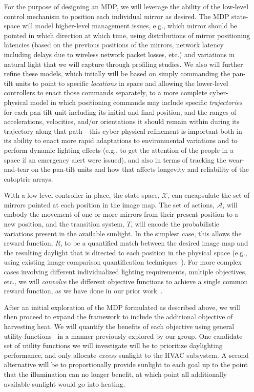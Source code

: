 For the purpose of designing an MDP, we will leverage the ability of the low-level
control mechanism to position each individual mirror as desired.  The MDP state-space 
will model higher-level management issues, e.g., which mirror should be pointed in which 
direction at which time, using distributions of mirror positioning latencies (based on 
the previous positions of the mirrors, network latency including delays due to wireless
network packet losses, etc.) and variations in natural light that we will capture 
through profiling studies.  We also will further refine these models, which intially 
will be based on simply commanding the pan-tilt units to point to specific 
\emph{locations} in space and allowing the lower-level controllers to enact those 
commands separately, to a more complete cyber-physical model in which positioning 
commands may include specific \emph{trajectories} for each pan-tilt unit including 
its initial and final position, and the ranges of accelerations, velocities, and/or 
orientations it should remain within during its trajectory along that path - this 
cyber-physical refinement is important both in its ability to enact more rapid 
adaptations to environmental variations and to perform dynamic lighting effects 
(e.g., to get the attention of the people in a space if an emergency alert were 
issued), and also in terms of tracking the wear-and-tear on the pan-tilt units and 
how that affects longevity and reliability of the catoptric arrays.

With a low-level controller in place, the state space, $\mathcal{X}$,
can encapsulate the set of mirrors pointed at each position in
the image map.  The set of actions, $\mathcal{A}$, will embody the movement
of one or more mirrors from their present position to a new position,
and the transition system, $T$, will encode the probabilistic variations
present in the available sunlight.  In the simplest case, this allows the 
reward function, $R$, to be a quantified match between the desired image 
map and the resulting daylight that is directed to each position in the 
physical space (e.g., using existing image comparison quantification 
techniques~\cite{ds99,my09,wbo97}).
For more complex cases involving different individualized lighting requirements,
multiple objectives, etc., we will \emph{convolve} the different objective
functions to achieve a single common reward function, as we have done
in our prior work~\cite{tblwgs11,tggs10}.

After an initial exploration of the MDP formulated as described above,
we will then proceed to expand the framework to include the additional
objective of harvesting heat.  We will quantify the benefits of each
objective using general utility functions~\cite{tggs10} in a manner previously
explored by our group. One candidate set of utility functions we will
investigate will be to prioritize daylighting performance, and only
allocate \emph{excess} sunlight to the HVAC subsystem. A second alternative
will be to proportionally provide sunlight to each goal up to the point
that the illumination can no longer benefit, at which point all additionally
available sunlight would go into heating.

